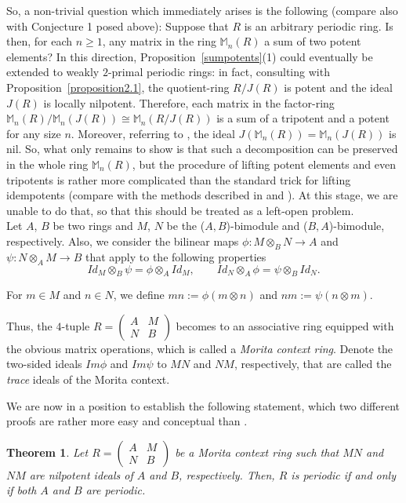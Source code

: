 \documentclass[12pt]{amsart}
\newtheorem{thm}{Theorem}[section]
\theoremstyle{definition}
\theoremstyle{remark}
\numberwithin{equation}{section}
\begin{document}
So, a non-trivial question which immediately arises is the following (compare also with Conjecture 1 posed above): Suppose that $R$ is an arbitrary periodic ring. Is then, for each $n\geq 1$, any matrix in the ring $\mathbb{M}_n(R)$ a sum of two potent elements? In this direction, Proposition~\ref{sumpotents}(1) could eventually be extended to weakly $2$-primal periodic rings: in fact, consulting with Proposition~\ref{proposition2.1}, the quotient-ring $R/J(R)$ is potent and the ideal $J(R)$ is locally nilpotent. Therefore, each matrix in the factor-ring $\mathbb{M}_n(R)/\mathbb{M}_n(J(R))\cong \mathbb{M}_n(R/J(R))$ is a sum of a tripotent and a potent for any size $n$. Moreover, referring to \cite{BM}, the ideal $J(\mathbb{M}_n(R))=\mathbb{M}_n(J(R))$ is nil. So, what only remains to show is that such a decomposition can be preserved in the whole ring $\mathbb{M}_n(R)$, but the procedure of lifting potent elements and even tripotents is rather more complicated than the standard trick for lifting idempotents (compare with the methods described in \cite{DGL} and \cite{khurana2021lifting}). At this stage, we are unable to do that, so that this should be treated as a left-open problem.\\

Let $A$, $B$ be two rings and $M$, $N$ be the ($A,B$)-bimodule and ($B,A$)-bimodule, respectively. Also, we consider the bilinear maps $\phi:M \otimes_B N \rightarrow A$ and $\psi: N \otimes_A M \rightarrow B$ that apply to the following properties
\[Id_M \otimes_B \psi = \phi \otimes_A Id_M, \quad  \quad Id_N \otimes_A \phi=\psi \otimes_B Id_N. \]

For $m \in M$ and $n \in N$, we define $mn:=\phi(m \otimes n)$ and $nm:= \psi(n \otimes m)$.

Thus, the $4$-tuple $R=\begin{pmatrix} A & M \\ N & B \end{pmatrix}$ becomes to an associative ring equipped with the obvious matrix operations, which is called a \emph{Morita context ring}. Denote the two-sided ideals $Im\phi$ and $Im\psi$ to $MN$ and $NM$, respectively, that are called the \emph{trace} ideals of the Morita context.

\medskip

We are now in a position to establish the following statement, which two different proofs are rather more easy and conceptual than \cite[Theorem 10.1.16]{CS}.

\begin{thm}\label{theorem2.9}
Let
$R =\begin{pmatrix}
  A & M\\
  N & B
\end{pmatrix}$ be a Morita context ring such that $MN$ and $NM$ are nilpotent ideals of $A$ and $B$, respectively. Then, $R$ is periodic if and only if both $A$ and $B$ are periodic.
\end{thm}
\end{document}
